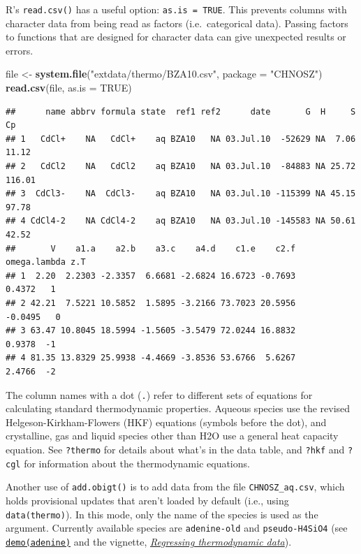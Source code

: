 \documentclass[]{tufte-book}
\newenvironment{Shaded}{}{}
\newcommand{\KeywordTok}[1]{\textcolor[rgb]{0.00,0.44,0.13}{\textbf{#1}}}
\newcommand{\DataTypeTok}[1]{\textcolor[rgb]{0.56,0.13,0.00}{#1}}
\newcommand{\StringTok}[1]{\textcolor[rgb]{0.25,0.44,0.63}{#1}}
\newcommand{\OtherTok}[1]{\textcolor[rgb]{0.00,0.44,0.13}{#1}}
\newcommand{\NormalTok}[1]{#1}
\begin{document}
\begin{marginfigure}
R's \texttt{read.csv()} has a useful option: \texttt{as.is\ =\ TRUE}.
This prevents columns with character data from being read as factors
(i.e.~categorical data). Passing factors to functions that are designed
for character data can give unexpected results or errors.
\end{marginfigure}

\begin{Shaded}
\begin{Highlighting}[]
\NormalTok{file <-}\StringTok{ }\KeywordTok{system.file}\NormalTok{(}\StringTok{"extdata/thermo/BZA10.csv"}\NormalTok{, }\DataTypeTok{package =} \StringTok{"CHNOSZ"}\NormalTok{)}
\KeywordTok{read.csv}\NormalTok{(file, }\DataTypeTok{as.is =} \OtherTok{TRUE}\NormalTok{)}
\end{Highlighting}
\end{Shaded}

\begin{verbatim}
##      name abbrv formula state  ref1 ref2      date       G  H     S     Cp
## 1   CdCl+    NA   CdCl+    aq BZA10   NA 03.Jul.10  -52629 NA  7.06  11.12
## 2   CdCl2    NA   CdCl2    aq BZA10   NA 03.Jul.10  -84883 NA 25.72 116.01
## 3  CdCl3-    NA  CdCl3-    aq BZA10   NA 03.Jul.10 -115399 NA 45.15  97.78
## 4 CdCl4-2    NA CdCl4-2    aq BZA10   NA 03.Jul.10 -145583 NA 50.61  42.52
##       V    a1.a    a2.b    a3.c    a4.d    c1.e    c2.f omega.lambda z.T
## 1  2.20  2.2303 -2.3357  6.6681 -2.6824 16.6723 -0.7693       0.4372   1
## 2 42.21  7.5221 10.5852  1.5895 -3.2166 73.7023 20.5956      -0.0495   0
## 3 63.47 10.8045 18.5994 -1.5605 -3.5479 72.0244 16.8832       0.9378  -1
## 4 81.35 13.8329 25.9938 -4.4669 -3.8536 53.6766  5.6267       2.4766  -2
\end{verbatim}

The column names with a dot (\texttt{.}) refer to different sets of
equations for calculating standard thermodynamic properties. Aqueous
species use the revised Helgeson-Kirkham-Flowers (HKF) equations
(symbols before the dot), and crystalline, gas and liquid species other
than H2O use a general heat capacity equation. See {\texttt{?thermo}}
for details about what's in the data table, and {\texttt{?hkf}} and
{\texttt{?cgl}} for information about the thermodynamic equations.

Another use of {\texttt{add.obigt()}} is to add data from the file
\texttt{CHNOSZ\_aq.csv}, which holds provisional updates that aren't
loaded by default (i.e., using {\texttt{data(thermo)}}). In this mode,
only the name of the species is used as the argument. Currently
available species are \texttt{adenine-old} and \texttt{pseudo-H4SiO4}
(see \href{../demo}{{\texttt{demo(adenine)}}} and the vignette,
\href{eos-regress.html}{{\emph{Regressing thermodynamic data}}}).
\end{document}

